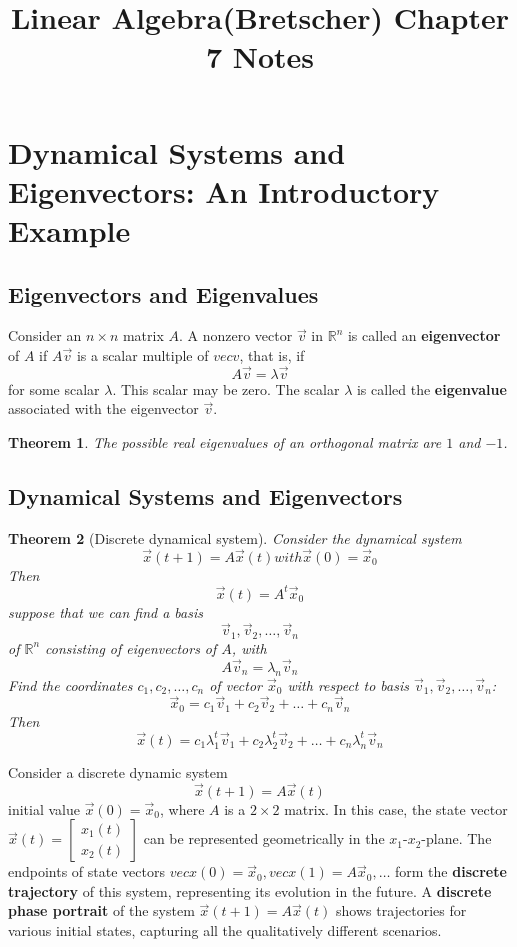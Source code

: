 \documentclass[letter]{article}
\title{Linear Algebra(Bretscher) Chapter 7 Notes}
\date{}
\newcommand{\R}{\mathbb{R}}
\newtheorem{theorem}{Theorem}[section]
\newenvironment{definition}[1][Definition]{\begin{trivlist}
\item[\hskip \labelsep {\bfseries #1}]}{\end{trivlist}}
\begin{document}
\maketitle
\vspace{-.5in}
\section{Dynamical Systems and Eigenvectors: An Introductory Example}
\subsection{Eigenvectors and Eigenvalues}
\begin{definition}
Consider an $n \times n$ matrix $A$. A nonzero vector $\vec v$ in $\R^n$ is called an \textbf{eigenvector} of $A$ if $A\vec v$ is a scalar multiple of $vec v$, that is, if
\[
A\vec v = \lambda \vec v
\]
for some scalar $\lambda$. This scalar may be zero.
The scalar $\lambda$ is called the \textbf{eigenvalue} associated with the eigenvector $\vec v$.
\end{definition}

\begin{theorem}
The possible real eigenvalues of an orthogonal matrix are $1$ and $-1$.
\end{theorem}

\subsection{Dynamical Systems and Eigenvectors}
\begin{theorem}[Discrete dynamical system]
Consider the dynamical system
\[
\vec x(t+1) = A\vec x(t) with \vec x(0) = \vec x_0
\]
Then
\[\vec x(t) = A^t\vec x_0\]
suppose that we can find a basis
\[
\vec v_1, \vec v_2, \ldots, \vec v_n
\]
of $\R^n$
consisting of eigenvectors of $A$, with
\[ A\vec v_n = \lambda_n \vec v_n\]
Find the coordinates $c_1, c_2, \ldots, c_n$ of vector $\vec x_0$ with respect to basis $\vec v_1, \vec v_2, \ldots, \vec v_n$:\\
\[
\vec x_0 = c_1\vec v_1 + c_2\vec v_2 + \ldots + c_n\vec v_n
\]
Then
\[
\vec x(t) = c_1\lambda_1^t\vec v_1 + c_2\lambda_2^t\vec v_2 + \ldots + c_n\lambda_n^t\vec v_n 
\]
\end{theorem}

\begin{definition}
Consider a discrete dynamic system
\[\vec x(t+1) = A\vec x(t)\]
initial value $\vec x(0) = \vec x_0$,
where $A$ is a $2\times 2$ matrix. In this case, the state vector $\vec x(t) = \begin{bmatrix}
x_1(t)\\
x_2(t)
\end{bmatrix}$
 can be represented geometrically in the $x_1$-$x_2$-plane.
The endpoints of state vectors $vec x(0) = \vec x_0, vec x(1) = A\vec x_0,\ldots$ form the \textbf{discrete trajectory} of this system, representing its evolution in the future.
A \textbf{discrete phase portrait} of the system $\vec x(t+1) = A\vec x(t)$ shows trajectories for various initial states, capturing all the qualitatively different scenarios.
\end{definition}
\end{document}
